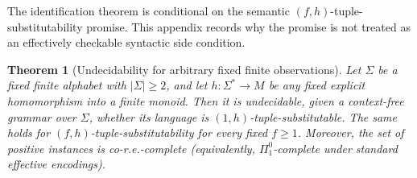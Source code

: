 \documentclass[11pt,a4paper]{article}
\newtheorem{theorem}{Theorem}[section]
\theoremstyle{remark}
\begin{document}
The identification theorem is conditional on the semantic
\((f,h)\)-tuple-substitutability promise.  This appendix records why the promise
is not treated as an effectively checkable syntactic side condition.

\begin{theorem}[Undecidability for arbitrary fixed finite observations]
\label{thm:promise-undecidable}
Let \(\Sigma\) be a fixed finite alphabet with \(|\Sigma|\ge2\), and let
\(h:\Sigma^*\to M\) be any fixed explicit homomorphism into a finite monoid.
Then it is undecidable, given a context-free grammar over \(\Sigma\), whether
its language is \((1,h)\)-tuple-substitutable.  The same holds for
\((f,h)\)-tuple-substitutability for every fixed \(f\ge1\).  Moreover, the set
of positive instances is co-r.e.-complete (equivalently,
\(\Pi^0_1\)-complete under standard effective encodings).
\end{theorem}
\end{document}
